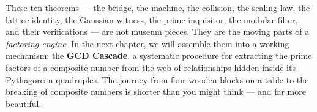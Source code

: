 \ornbreak


These ten theorems --- the bridge, the machine, the collision, the scaling law, the lattice identity, the Gaussian witness, the prime inquisitor, the modular filter, and their verifications --- are not museum pieces. They are the moving parts of a \textit{factoring engine}. In the next chapter, we will assemble them into a working mechanism: the \textbf{GCD Cascade}, a systematic procedure for extracting the prime factors of a composite number from the web of relationships hidden inside its Pythagorean quadruples. The journey from four wooden blocks on a table to the breaking of composite numbers is shorter than you might think --- and far more beautiful.

